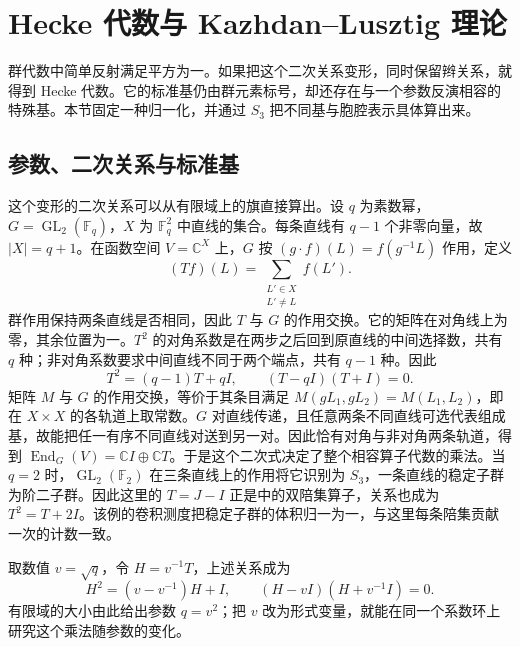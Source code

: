%
%
\section{Hecke 代数与 Kazhdan--Lusztig 理论}
\label{b5:sec:A04}

群代数中简单反射满足平方为一。如果把这个二次关系变形，同时保留辫关系，就得到 Hecke 代数。它的标准基仍由群元素标号，却还存在与一个参数反演相容的特殊基。本节固定一种归一化，并通过 \(S_3\) 把不同基与胞腔表示具体算出来。

\subsection{参数、二次关系与标准基}
\label{b5:subsec:A04:01}

这个变形的二次关系可以从有限域上的旗直接算出。设 \(q\) 为素数幂，\(G=\operatorname{GL}_2(\mathbb F_q)\)，\(X\) 为 \(\mathbb F_q^2\) 中直线的集合。每条直线有 \(q-1\) 个非零向量，故 \(|X|=q+1\)。在函数空间 \(V=\mathbb C^X\) 上，\(G\) 按 \((g\cdot f)(L)=f(g^{-1}L)\) 作用，定义
\[
	(Tf)(L)=\sum_{\substack{L'\in X\\L'\ne L}}f(L').
\]
群作用保持两条直线是否相同，因此 \(T\) 与 \(G\) 的作用交换。它的矩阵在对角线上为零，其余位置为一。\(T^2\) 的对角系数是在两步之后回到原直线的中间选择数，共有 \(q\) 种；非对角系数要求中间直线不同于两个端点，共有 \(q-1\) 种。因此
\[
	T^2=(q-1)T+qI,\qquad (T-qI)(T+I)=0.
\]
矩阵 \(M\) 与 \(G\) 的作用交换，等价于其条目满足 \(M(gL_1,gL_2)=M(L_1,L_2)\)，即在 \(X\times X\) 的各轨道上取常数。\(G\) 对直线传递，且任意两条不同直线可选代表组成基，故能把任一有序不同直线对送到另一对。因此恰有对角与非对角两条轨道，得到 \(\operatorname{End}_G(V)=\mathbb C I\oplus\mathbb C T\)。于是这个二次式决定了整个相容算子代数的乘法。当 \(q=2\) 时，\(\operatorname{GL}_2(\mathbb F_2)\) 在三条直线上的作用将它识别为 \(S_3\)，一条直线的稳定子群为阶二子群。因此这里的 \(T=J-I\) 正是中的双陪集算子，关系也成为 \(T^2=T+2I\)。该例的卷积测度把稳定子群的体积归一为一，与这里每条陪集贡献一次的计数一致。

\ProseParagraphBreak
取数值 \(v=\sqrt q\)，令 \(H=v^{-1}T\)，上述关系成为
\[
	H^2=(v-v^{-1})H+I,\qquad (H-vI)(H+v^{-1}I)=0.
\]
有限域的大小由此给出参数 \(q=v^2\)；把 \(v\) 改为形式变量，就能在同一个系数环上研究这个乘法随参数的变化。

